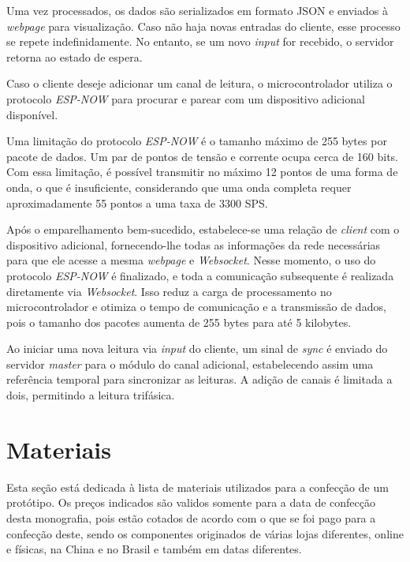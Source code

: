 Uma vez processados, os dados são serializados em formato JSON e enviados à \textit{webpage} para visualização. Caso não haja novas entradas do cliente, esse processo se repete indefinidamente. No entanto, se um novo \textit{input} for recebido, o servidor retorna ao estado de espera.

Caso o cliente deseje adicionar um canal de leitura, o microcontrolador utiliza o protocolo \textit{ESP-NOW} para procurar e parear com um dispositivo adicional disponível.

Uma limitação do protocolo \textit{ESP-NOW} é o tamanho máximo de 255 bytes por pacote de dados. Um par de pontos de tensão e corrente ocupa cerca de 160 bits. Com essa limitação, é possível transmitir no máximo 12 pontos de uma forma de onda, o que é insuficiente, considerando que uma onda completa requer aproximadamente 55 pontos a uma taxa de 3300 \gls{SPS}.

Após o emparelhamento bem-sucedido, estabelece-se uma relação de \textit{client} com o dispositivo adicional, fornecendo-lhe todas as informações da rede necessárias para que ele acesse a mesma \textit{webpage} e \textit{Websocket}. Nesse momento, o uso do protocolo \textit{ESP-NOW} é finalizado, e toda a comunicação subsequente é realizada diretamente via \textit{Websocket}. Isso reduz a carga de processamento no microcontrolador e otimiza o tempo de comunicação e a transmissão de dados, pois o tamanho dos pacotes aumenta de 255 bytes para até 5 kilobytes.

Ao iniciar uma nova leitura via \textit{input} do cliente, um sinal de \textit{sync} é enviado do servidor \textit{master} para o módulo do canal adicional, estabelecendo assim uma referência temporal para sincronizar as leituras. A adição de canais é limitada a dois, permitindo a leitura trifásica.





\section{Materiais}\label{sec:materiais}

Esta seção está dedicada à lista de materiais utilizados para a confecção de um protótipo. Os preços indicados são validos somente para a data de confecção desta monografia, pois estão cotados de acordo com o que se foi pago para a confecção deste, sendo os componentes originados de várias lojas diferentes, online e físicas, na China e no Brasil e também em datas diferentes.


